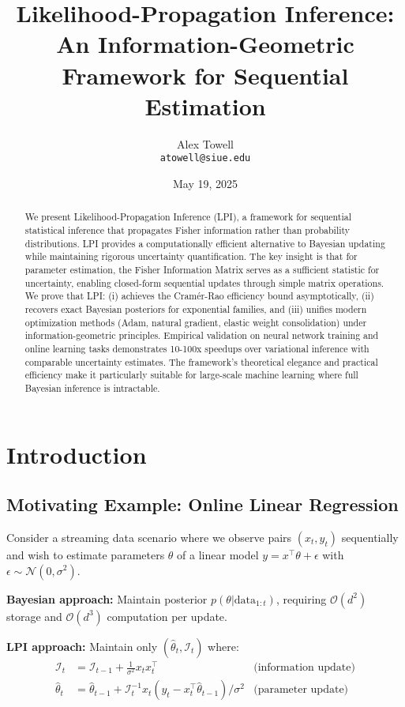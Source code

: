 \documentclass[11pt]{article}
\title{Likelihood-Propagation Inference: An Information-Geometric Framework for Sequential Estimation}
\author{Alex Towell \\ \texttt{atowell@siue.edu}}
\date{May 19, 2025}
\begin{document}
\maketitle

\begin{abstract}
We present Likelihood-Propagation Inference (LPI), a framework for sequential statistical inference that propagates Fisher information rather than probability distributions. LPI provides a computationally efficient alternative to Bayesian updating while maintaining rigorous uncertainty quantification. The key insight is that for parameter estimation, the Fisher Information Matrix serves as a sufficient statistic for uncertainty, enabling closed-form sequential updates through simple matrix operations. We prove that LPI: (i) achieves the Cramér-Rao efficiency bound asymptotically, (ii) recovers exact Bayesian posteriors for exponential families, and (iii) unifies modern optimization methods (Adam, natural gradient, elastic weight consolidation) under information-geometric principles. Empirical validation on neural network training and online learning tasks demonstrates 10-100x speedups over variational inference with comparable uncertainty estimates. The framework's theoretical elegance and practical efficiency make it particularly suitable for large-scale machine learning where full Bayesian inference is intractable.
\end{abstract}

\section{Introduction}

\subsection{Motivating Example: Online Linear Regression}

Consider a streaming data scenario where we observe pairs $(x_t, y_t)$ sequentially and wish to estimate parameters $\theta$ of a linear model $y = x^\top\theta + \epsilon$ with $\epsilon \sim \mathcal{N}(0, \sigma^2)$. 

\textbf{Bayesian approach:} Maintain posterior $p(\theta|\text{data}_{1:t})$, requiring $\mathcal{O}(d^2)$ storage and $\mathcal{O}(d^3)$ computation per update.

\textbf{LPI approach:} Maintain only $(\hat{\theta}_t, \mathcal{I}_t)$ where:
\begin{align}
\mathcal{I}_t &= \mathcal{I}_{t-1} + \frac{1}{\sigma^2}x_t x_t^\top & \text{(information update)}\\
\hat{\theta}_t &= \hat{\theta}_{t-1} + \mathcal{I}_t^{-1}x_t(y_t - x_t^\top\hat{\theta}_{t-1})/\sigma^2 & \text{(parameter update)}
\end{align}
\end{document}
